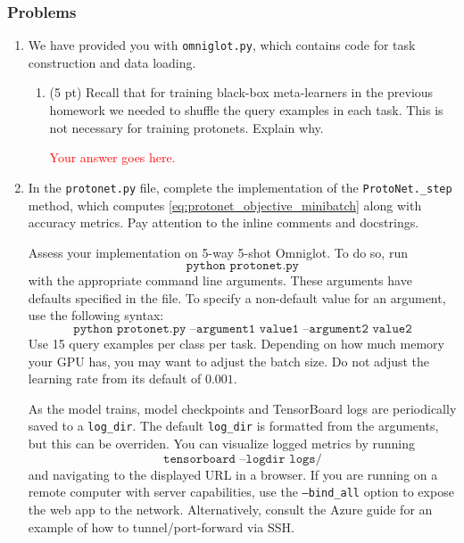 \documentclass[12pt]{article}
\begin{document}
\subsubsection*{Problems}


\begin{enumerate}
    \item We have provided you with \texttt{omniglot.py}, which contains code for task construction and data loading.
    \begin{enumerate}[label=(\alph*)]
        \item (5 pt) Recall that for training black-box meta-learners in the previous homework we needed to shuffle the query examples in each task. This is not necessary for training protonets. Explain why.
        
        \textcolor{red}{Your answer goes here.}
        
    \end{enumerate}
    
    \newpage
    \item In the \texttt{protonet.py} file, complete the implementation of the \texttt{ProtoNet.\_step} method, which computes \eqref{eq:protonet_objective_minibatch} along with accuracy metrics. Pay attention to the inline comments and docstrings.
    
    Assess your implementation on 5-way 5-shot Omniglot. To do so, run 
    \begin{equation*} 
        \texttt{python protonet.py} 
    \end{equation*}
    with the appropriate command line arguments. These arguments have defaults specified in the file. To specify a non-default value for an argument, use the following syntax:
    \begin{equation*}
        \texttt{python protonet.py --argument1 value1 --argument2 value2}
    \end{equation*}
    Use 15 query examples per class per task. Depending on how much memory your GPU has, you may want to adjust the batch size. Do not adjust the learning rate from its default of $0.001$.
    
     As the model trains, model checkpoints and TensorBoard logs are periodically saved to a \texttt{log\_dir}. The default \texttt{log\_dir} is formatted from the arguments, but this can be overriden. You can visualize logged metrics by running
    \begin{equation*}
        \texttt{tensorboard --logdir logs/}
    \end{equation*}
    and navigating to the displayed URL in a browser. If you are running on a remote computer with server capabilities, use the \texttt{--bind\_all} option to expose the web app to the network. Alternatively, consult the Azure guide for an example of how to tunnel/port-forward via SSH.
    

\end{enumerate}
\end{document}

